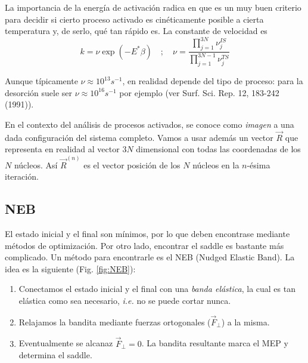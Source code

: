  La importancia de la energía de activación radica en que es un muy buen criterio para decidir si cierto proceso activado es cinéticamente posible a cierta temperatura y, de serlo, qué tan rápido es. La constante de velocidad es
    $$k = \nu \exp(-E^{*} \beta) \quad ; \quad \nu = \frac{\prod_{j=1}^{3N} \nu_j^{IS} }{\prod_{j=1}^{3N-1} \nu_j^{TS}}$$

  Aunque típicamente $\nu \approx 10^{13} s^{-1}$, en realidad depende del tipo de proceso: para la desorción suele ser $\nu \approx 10^{16} s^{-1}$ por ejemplo (ver Surf. Sci. Rep. 12, 183-242 (1991)).

  En el contexto del análisis de procesos activados, se conoce como \emph{imagen} a una dada configuración del sistema completo. Vamos a usar además un vector $\vec{R}$ que representa en realidad al vector $3N$ dimensional con todas las coordenadas de los $N$ núcleos. Así $\vec{R}^{(n)}$ es el vector posición de los $N$ núcleos en la $n$-ésima iteración.

\subsection{NEB}

  El estado inicial y el final son mínimos, por lo que deben encontrase mediante métodos de optimización. Por otro lado, encontrar el saddle es bastante más complicado. Un método para encontrarle es el NEB (Nudged Elastic Band). La idea es la siguiente (Fig. \ref{fig:NEB}):
    \begin{enumerate}
      \item Conectamos el estado inicial y el final con una \emph{banda elástica}, la cual es tan elástica como sea necesario, \emph{i.e.} no se puede cortar nunca.
      \item Relajamos la bandita mediante fuerzas ortogonales ($\vec{F}_{\perp}$) a la misma.
      \item Eventualmente se alcanaz $\vec{F}_{\perp} = 0$. La bandita resultante marca el MEP y determina el saddle.
    \end{enumerate}

